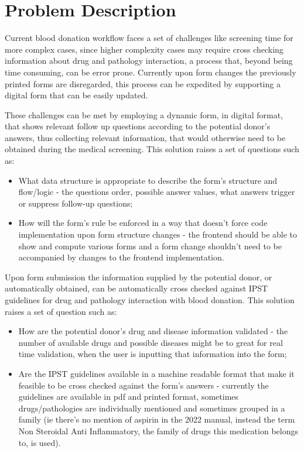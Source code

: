 %
%
\chapter{Problem Description} \label{cap:enquadramento}

Current blood donation workflow faces a set of challenges like screening time for more complex cases, since higher complexity cases may require cross checking information about drug and pathology interaction, a process that, beyond being time consuming, can be error prone. Currently upon form changes the previously printed forms are disregarded, this process can be expedited by supporting a digital form that can be easily updated.

These challenges can be met by employing a dynamic form, in digital format, that shows relevant follow up questions according to the potential donor's answers, thus collecting relevant information, that would otherwise need to be obtained during the medical screening.
This solution raises a set of questions such as:
\begin{itemize}
	\item What data structure is appropriate to describe the form's structure and flow/logic - 
	the questions order, possible answer values, what answers trigger or suppress follow-up questions;
	\item How will the form's rule be enforced in a way that doesn't force code implementation upon form structure changes - the frontend should be able to show and compute various forms and a form change shouldn't need to be accompanied by changes to the frontend implementation.
\end{itemize}

Upon form submission the information supplied by the potential donor, or automatically obtained, can be automatically cross checked against IPST guidelines for drug and pathology interaction with blood donation.
This solution raises a set of question such as:
\begin{itemize}
	\item How are the potential donor's drug and disease information validated - the number of available drugs and possible diseases might be to great for real time validation, when the user is inputting that information into the form;
	\item Are the IPST guidelines available in a machine readable format that make it feasible to be cross checked against the form's answers - currently the guidelines are available in pdf and printed format, sometimes drugs/pathologies are individually mentioned and sometimes grouped in a family (ie there's no mention of aspirin in the 2022 manual, instead the term Non Steroidal Anti Inflammatory, the family of drugs this medication belongs to, is used).
\end{itemize}

